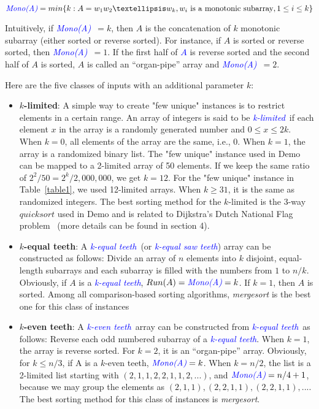 \documentclass[AMA,STIX1COL]{WileyNJD-v2}
\newcommand{\klit}{\textcolor{blue}{\emph{k-limited}}}
\newcommand{\keq}{\textcolor{blue}{\emph{k-equal teeth}}}
\newcommand{\kev}{\textcolor{blue}{\emph{k-even teeth}}}
\newcommand {\mono}{\emph{\textcolor{blue}{Mono(A)}}}
\newcommand{\msort}{\emph{mergesort }}
\newcommand{\msortn}{\emph{mergesort}}
\begin{document}
\[ \mono = min\{ k : A =  w_1 w_2 … w_k, w_i  \text { is a monotonic subarray},1 \leq i \le k\} \]
           
Intuitively, if \mono\ $= k$, then $A$ is the concatenation of $k$ monotonic subarray (either sorted or reverse sorted). 
For instance, if $A$ is sorted or reverse sorted, then \mono\ $ = 1$. 
If the first half of \textcolor{blue}{$A$} is reverse sorted and the second half of $A$ is sorted, $A$ is called an “organ-pipe” array and \mono\ $ = 2$.  

Here are the five classes of inputs with an additional parameter $k$:

\begin{itemize}
\item \textbf{$k$-limited}: A simple way to create "few unique" instances is to restrict elements in a certain range. 
An array of integers is said to be \klit \ if each element $x$ in the array is a randomly generated number and $0 \leq x \leq 2k$. 
When $k = 0$, all elements of the array are the same, i.e., 0. 
When $k = 1$, the array is a randomized binary list. 
The "few unique" instance used in Demo can be mapped to a 2-limited array of 50 elements.  
If we keep the same ratio of $2^2/50 = 2^k/2,000,000$, we get $k = 12$.  
For the "few unique" instance in Table~\ref{table1}, we used 12-limited arrays.  
When $k \ge 31$, it is the same as randomized integers. 
The best sorting method for the $k$-limited is the $3$-way $quicksort$ used in Demo and is related to Dijkstra’s Dutch National Flag problem~\cite{KIM2009454} (more details can be found in section 4).

\item \textbf{$k$-equal teeth}: 
A \keq \ (or \textcolor{blue}{\emph{k-equal saw teeth}}) array can be constructed as follows: Divide an array of $n$ elements into $k$ disjoint, equal-length subarrays and each subarray is filled with the numbers from $1$ to $n/k$. Obviously, if $A$ is a \keq, $Run(A) = \mono = k$. If $k = 1$, then $A$ is sorted. 
Among all comparison-based sorting algorithms, \msort is the best one for this class of instances

\item \textbf{$k$-even teeth}:  A \kev \ array can be constructed from \keq \ as follows: 
Reverse each odd numbered subarray of a \keq. 
When $k = 1$, the array is reverse sorted. 
For $k = 2$, it is an ``organ-pipe” array.  
Obviously, for $k \leq n/3$, if A is a $k$-even teeth, $\mono = k$. 
When $k = n/2$, the list is a 2-limited list starting with $(2,1,1,2,2,1,1,2, ...)$, and $\mono =  n/4+1$, because we may group the elements as $(2,1,1), (2,2,1,1), (2,2,1,1), ...$. 
The best sorting method for this class of instances is \msortn.


\end{itemize}
\end{document}
